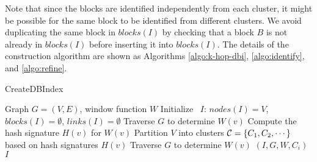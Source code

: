 Note that since the blocks are identified independently from each cluster,
it might be possible for the same block to be identified from different clusters.
We avoid duplicating the same block in $blocks(I)$ by checking that a block $B$ is not already in $blocks(I)$
before inserting it into $blocks(I)$.
The details of the construction algorithm are shown as Algorithms
\ref{algo:k-hop-dbi},
\ref{algo:identify},
and
\ref{algo:refine}.
\begin{algorithm}
\caption{CreateDBIndex}
\begin{algorithmic}[1]  \small
\Require Graph $G=(V,E)$, window function $W$
\State Initialize \DBIndex\ $I$: $nodes(I)=V$, $blocks(I)=\emptyset$, $links(I)=\emptyset$
	\State Traverse $G$ to determine $W(v)$
	\State Compute the hash signature $H(v)$ for $W(v)$
\EndFor
\State Partition $V$ into clusters ${\cal C} = \{C_1,C_2,\cdots\}$ based on hash signatures $H(v)$
		\State Traverse $G$ to determine $W(v)$
	\EndFor
	 $(I,G,W,C_i)$
\EndFor \\
\Return $I$
\end{algorithmic}
\label{algo:k-hop-dbi}
\end{algorithm}


